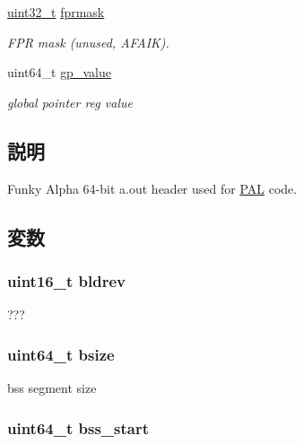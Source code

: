 \begin{DoxyCompactItemize}
\hyperlink{Type_8hh_a435d1572bf3f880d55459d9805097f62}{uint32\_\-t} \hyperlink{structaout__exechdr_a71bb59ada12703a7cbd02f6c1934667d}{fprmask}
\begin{DoxyCompactList}\small\item\em FPR mask (unused, AFAIK). \item\end{DoxyCompactList}\item 
uint64\_\-t \hyperlink{structaout__exechdr_ab2598f968dfeda7859c42fd430face96}{gp\_\-value}
\begin{DoxyCompactList}\small\item\em global pointer reg value \item\end{DoxyCompactList}\end{DoxyCompactItemize}


\subsection{説明}
Funky Alpha 64-\/bit a.out header used for \hyperlink{structPAL}{PAL} code. 

\subsection{変数}
\hypertarget{structaout__exechdr_a4821bde2c206ea0508c21735f751df63}{
\subsubsection[{bldrev}]{\setlength{\rightskip}{0pt plus 5cm}uint16\_\-t {\bf bldrev}}}
\label{structaout__exechdr_a4821bde2c206ea0508c21735f751df63}


??? \hypertarget{structaout__exechdr_a3ab66d1b84a53d94cc37a352e2a6f924}{
\subsubsection[{bsize}]{\setlength{\rightskip}{0pt plus 5cm}uint64\_\-t {\bf bsize}}}
\label{structaout__exechdr_a3ab66d1b84a53d94cc37a352e2a6f924}


bss segment size \hypertarget{structaout__exechdr_ab48b1f7afd2111d3a58e3cd8fb2a93ed}{
\subsubsection[{bss\_\-start}]{\setlength{\rightskip}{0pt plus 5cm}uint64\_\-t {\bf bss\_\-start}}}
\label{structaout__exechdr_ab48b1f7afd2111d3a58e3cd8fb2a93ed}


